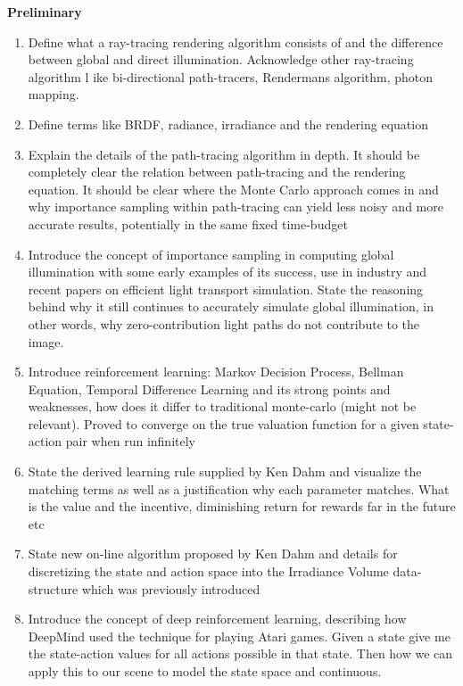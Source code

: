 \documentclass[ %
                    author={Callum Pearce},
                supervisor={Dr. Neill Campbell},
                    degree={MEng},
                     title={How effective are Temporal difference learning methods in reducing the number of zero contribution light paths in Path tracing?},
                  subtitle={},
                      type={research},
                      year={2019} ]{dissertation}
\begin{document}
\textbf{Preliminary}
\begin{enumerate}
\item Define what a ray-tracing rendering algorithm consists of and the difference 
between global and direct illumination. Acknowledge other ray-tracing algorithm l
ike bi-directional path-tracers, Rendermans algorithm, photon mapping. 

\item Define terms like BRDF, radiance, irradiance and the rendering equation

\item Explain the details of the path-tracing algorithm in depth. It should be 
completely clear the relation between path-tracing and the rendering equation. 
It should be clear where the Monte Carlo approach comes in and why 
importance sampling within path-tracing can yield less noisy and more accurate
 results, potentially in the same fixed time-budget

\item Introduce the concept of importance sampling in computing global 
illumination with some early examples of its success, use in industry and recent 
papers on efficient light transport simulation. State the reasoning behind why
it still continues to accurately simulate global illumination, in other words, why
zero-contribution light paths do not contribute to the image.

\item Introduce reinforcement learning: Markov Decision Process, Bellman 
Equation, Temporal Difference Learning and its strong points and weaknesses,
 how does it differ to traditional monte-carlo (might not be relevant). Proved 
 to converge on the true valuation function for a given state-action pair when 
 run infinitely

\item State the derived learning rule supplied by Ken Dahm and visualize the 
matching terms as well as a justification why each parameter matches. What 
is the value and the incentive, diminishing return for rewards far in the future etc

\item State new on-line algorithm proposed by Ken Dahm and details for 
discretizing the state and action space into the Irradiance Volume data-structure
 which was previously introduced 

\item Introduce the concept of deep reinforcement learning, describing how
 DeepMind used the technique for playing Atari games. Given a state give me 
 the state-action values for all actions possible in that state.  Then how we 
 can apply this to our scene to model the state space and continuous.
 
 

\end{enumerate}
\end{document}

